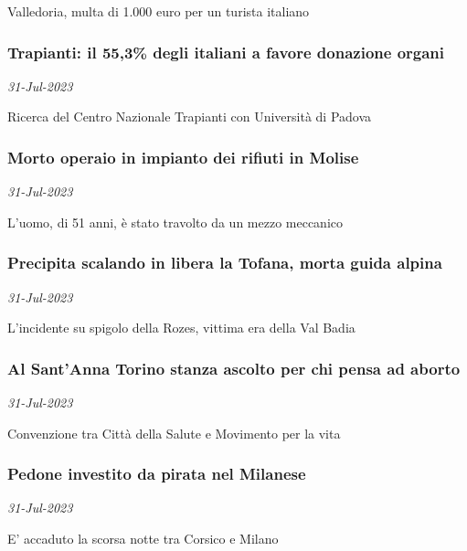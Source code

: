 Valledoria, multa di 1.000 euro per un turista italiano
\subsubsection{Trapianti: il 55,3\% degli italiani a favore donazione organi \href{https://www.ansa.it/sito/notizie/cronaca/2023/07/31/trapianti-il-553-degli-italiani-a-favore-donazione-organi_d2b3c884-28d9-47df-bd84-5650ef19b68e.html}{}}
\textit{31-Jul-2023}

Ricerca del Centro Nazionale Trapianti con Universit\`{a} di Padova
\subsubsection{Morto operaio in impianto dei rifiuti in Molise \href{https://www.ansa.it/sito/notizie/cronaca/2023/07/31/morto-operaio-in-impianto-dei-rifiuti-in-molise_0204f1bb-683e-40d0-91d7-d8601787fdbe.html}{}}
\textit{31-Jul-2023}

L'uomo, di 51 anni, \`{e} stato travolto da un mezzo meccanico
\subsubsection{Precipita scalando in libera la Tofana, morta guida alpina \href{https://www.ansa.it/sito/notizie/cronaca/2023/07/31/precipita-scalando-in-libera-la-tofana-morta-guida-alpina_94993a4e-7b9a-4255-b808-2b00c380fce5.html}{}}
\textit{31-Jul-2023}

L'incidente su spigolo della Rozes, vittima era della Val Badia
\subsubsection{Al Sant'Anna Torino stanza ascolto per chi pensa ad aborto \href{https://www.ansa.it/sito/notizie/cronaca/2023/07/31/al-santanna-torino-stanza-ascolto-per-chi-pensa-ad-aborto_8d2a78d4-4635-465a-a9ae-b9b0c72abbf8.html}{}}
\textit{31-Jul-2023}

Convenzione tra Citt\`{a} della Salute e Movimento per la vita
\subsubsection{Pedone investito da pirata nel Milanese \href{https://www.ansa.it/sito/notizie/cronaca/2023/07/31/pedone-investito-da-pirata-nel-milanese_e3039980-e9e7-460e-8bc2-c033a5d7e7bd.html}{}}
\textit{31-Jul-2023}

E' accaduto la scorsa notte tra Corsico e Milano
